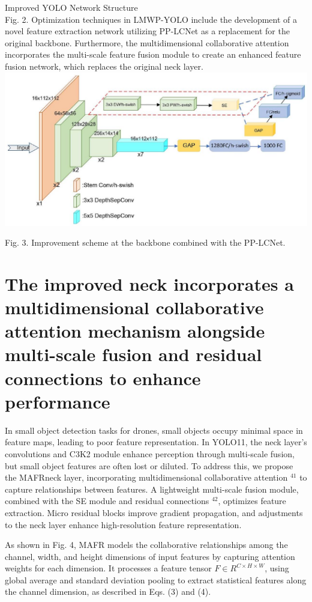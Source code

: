 \documentclass{article}
\begin{document}
Improved YOLO Network Structure\\
Fig. 2. Optimization techniques in LMWP-YOLO include the development of a novel feature extraction network utilizing PP-LCNet as a replacement for the original backbone. Furthermore, the multidimensional collaborative attention incorporates the multi-scale feature fusion module to create an enhanced feature fusion network, which replaces the original neck layer.\\
\includegraphics[max width=\textwidth, center]{2025_08_05_34f8389150f57116e76bg-05}

Fig. 3. Improvement scheme at the backbone combined with the PP-LCNet.

\section*{The improved neck incorporates a multidimensional collaborative attention mechanism alongside multi-scale fusion and residual connections to enhance performance}
In small object detection tasks for drones, small objects occupy minimal space in feature maps, leading to poor feature representation. In YOLO11, the neck layer's convolutions and C3K2 module enhance perception through multi-scale fusion, but small object features are often lost or diluted. To address this, we propose the MAFRneck layer, incorporating multidimensional collaborative attention ${ }^{41}$ to capture relationships between features. A lightweight multi-scale fusion module, combined with the SE module and residual connections ${ }^{42}$, optimizes feature extraction. Micro residual blocks improve gradient propagation, and adjustments to the neck layer enhance high-resolution feature representation.

As shown in Fig. 4, MAFR models the collaborative relationships among the channel, width, and height dimensions of input features by capturing attention weights for each dimension. It processes a feature tensor $F \in R^{C \times H \times W}$, using global average and standard deviation pooling to extract statistical features along the channel dimension, as described in Eqs. (3) and (4).
\end{document}

